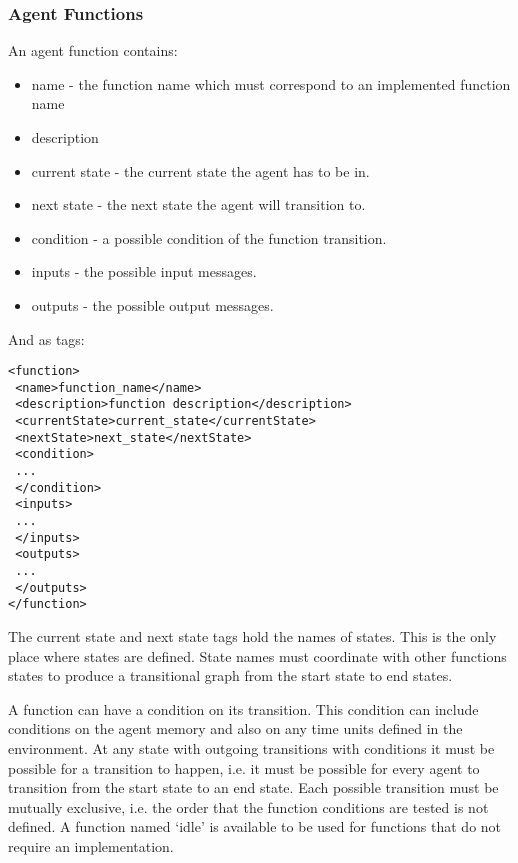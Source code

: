 \subsubsection{Agent Functions}

An agent function contains:

\begin{itemize}
\item name - the function name which must correspond to an implemented function
name
\item description
\item current state - the current state the agent has to be in.
\item next state - the next state the agent will transition to.
\item condition - a possible condition of the function transition.
\item inputs - the possible input messages.
\item outputs - the possible output messages.
\end{itemize}

And as tags:

\begin{mylisting}
\begin{verbatim}
<function>
 <name>function_name</name>
 <description>function description</description>
 <currentState>current_state</currentState>
 <nextState>next_state</nextState>
 <condition>
 ...
 </condition>
 <inputs>
 ...
 </inputs>
 <outputs>
 ...
 </outputs>
</function>
\end{verbatim}
\end{mylisting}

The current state and next state tags hold the names of states. This is the
only place where states are defined. State names must coordinate with other
functions states to produce a transitional graph from the start state to end
states.

\label{functioncond}

A function can have a condition on its transition. This condition can include
conditions on the agent memory and also on any time units defined in the
environment. At any state with outgoing transitions with conditions it must be
possible for a transition to happen, i.e. it must be possible for every agent
to transition from the start state to an end state. Each possible transition
must be mutually exclusive, i.e. the order that the function conditions are
tested is not defined. A function named `idle' is available to be used for
functions that do not require an implementation.

